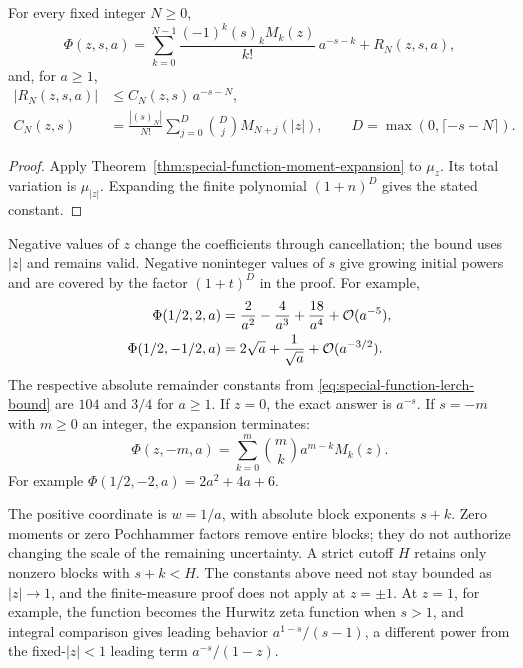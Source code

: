 \begin{corollary}
\label{cor:special-function-lerch}
For every fixed integer $N\ge0$,
\begin{equation}
 \Phi(z,s,a)=\sum_{k=0}^{N-1}
       \frac{(-1)^k(s)_k M_k(z)}{k!}\,a^{-s-k}
              +R_N(z,s,a),
 \label{eq:special-function-lerch-expansion}
\end{equation}
and, for $a\ge1$,
\begin{equation}
\begin{aligned}
 |R_N(z,s,a)|&\le C_N(z,s)\,a^{-s-N},\\
 C_N(z,s)&=\frac{|(s)_N|}{N!}
       \sum_{j=0}^{D}\binom Dj M_{N+j}(|z|),
 \qquad D=\max(0,\lceil-s-N\rceil).
\end{aligned}
\label{eq:special-function-lerch-bound}
\end{equation}
\end{corollary}
\begin{proof}
Apply Theorem~\ref{thm:special-function-moment-expansion} to $\mu_z$.
Its total variation is $\mu_{|z|}$. Expanding the finite polynomial
$(1+n)^D$ gives the stated constant.
\end{proof}

Negative values of $z$ change the coefficients through cancellation;
the bound uses $|z|$ and remains valid. Negative noninteger values of
$s$ give growing initial powers and are covered by the factor
$(1+t)^D$ in the proof. For example,
\begin{equation}
\begin{aligned}
 \Phi(1/2,2,a)
   &=\frac2{a^2}-\frac4{a^3}+\frac{18}{a^4}
                   +\mathcal O(a^{-5}),\\
 \Phi(1/2,-1/2,a)
   &=2\sqrt a+\frac1{\sqrt a}+\mathcal O(a^{-3/2}).
\end{aligned}
\label{eq:special-function-lerch-examples}
\end{equation}
The respective absolute remainder constants from
\eqref{eq:special-function-lerch-bound} are $104$ and $3/4$ for
$a\ge1$. If $z=0$, the exact answer is $a^{-s}$. If $s=-m$ with
$m\ge0$ an integer, the expansion terminates:
\[
 \Phi(z,-m,a)=\sum_{k=0}^m\binom mk a^{m-k}M_k(z).
\]
For example $\Phi(1/2,-2,a)=2a^2+4a+6$.

The positive coordinate is $w=1/a$, with absolute block exponents
$s+k$. Zero moments or zero Pochhammer factors remove entire blocks;
they do not authorize changing the scale of the remaining uncertainty.
A strict cutoff $H$ retains only nonzero blocks with $s+k<H$.
The constants above need not stay bounded as $|z|\to1$, and the
finite-measure proof does not apply at $z=\pm1$. At $z=1$, for example,
the function becomes the Hurwitz zeta function when $s>1$, and integral
comparison gives leading behavior $a^{1-s}/(s-1)$, a different power
from the fixed-$|z|<1$ leading term $a^{-s}/(1-z)$.


